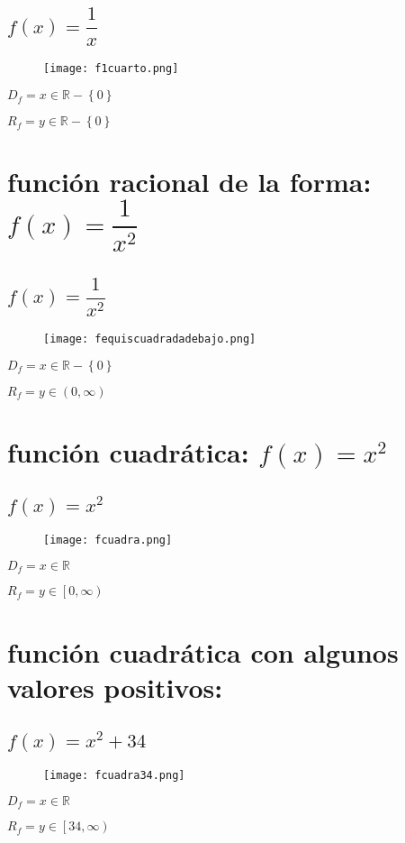 \documentclass[12pt]{article}
\begin{document}
\subsection{$f(x) = \dfrac{1}{x}$}
\begin{figure}[htb] \centering \texttt{[image: f1cuarto.png]} \end{figure}
$D_f = x \in \mathbb{R} -  \left\lbrace0\right\rbrace $  \par
$R_f = y \in \mathbb{R} -  \left\lbrace0\right\rbrace$
\section{función {\cyan racional de la forma}: $f(x) = \dfrac{1}{x^2}$}
\subsection{$f(x) = \dfrac{1}{x^2}$}
\begin{figure}[htb] \centering \texttt{[image: fequiscuadradadebajo.png]} \end{figure}
$D_f = x \in \mathbb{R} -  \left\lbrace0\right\rbrace $  \par
$R_f = y \in \left(0,\infty\right)$
\newpage

\section{función {\cyan cuadrática}: $f(x) = x^2$}
\subsection{$f(x) = x^2$}
\begin{figure}[htb] \centering \texttt{[image: fcuadra.png]} \end{figure}
$D_f = x \in \mathbb{R}$ \par
$R_f = y \in \left[0,\infty\right)$
\section{función {\cyan cuadrática} con algunos {\cyan valores positivos}: }
\subsection{$f(x) = x^2 + 34$}
\begin{figure}[htb] \centering \texttt{[image: fcuadra34.png]} \end{figure}
$D_f = x \in \mathbb{R}$ \par
$R_f = y \in \left[34,\infty\right)$
\newpage
\end{document}
